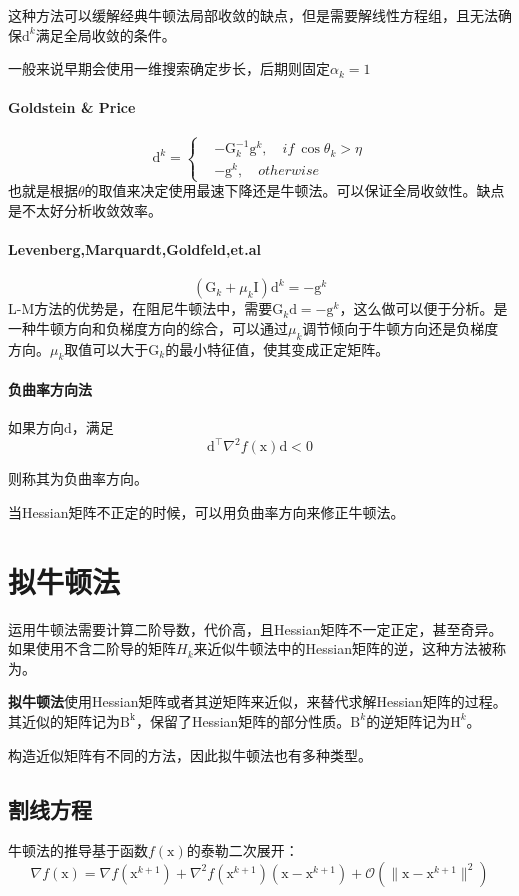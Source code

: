 \documentclass[a4paper]{D:/repositories/MyDGP/latex/PaperReadingLog}
\begin{document}
这种方法可以缓解经典牛顿法局部收敛的缺点，但是需要解线性方程组，且无法确保$\mathrm{d}^k$满足全局收敛的条件。

一般来说早期会使用一维搜索确定步长，后期则固定$\alpha_k=1$

\paragraph{Goldstein \& Price}
$$
\mathrm{d}^k=\left\{
\begin{aligned}
    &-\mathrm{G}_k^{-1}\mathrm{g}^k,\quad if\ \cos\theta_k>\eta\\
    &-\mathrm{g}^k,\quad otherwise
\end{aligned}
\right.
$$
也就是根据$\theta$的取值来决定使用最速下降还是牛顿法。可以保证全局收敛性。缺点是不太好分析收敛效率。

\paragraph{Levenberg,Marquardt,Goldfeld,et.al}
$$
(\mathrm{G}_k+\mu_k\mathrm{I})\mathrm{d}^k=-\mathrm{g}^k
$$
L-M方法的优势是，在阻尼牛顿法中，需要$\mathrm{G}_k\mathrm{d}=-\mathrm{g}^k$，这么做可以便于分析。是一种牛顿方向和负梯度方向的综合，可以通过$\mu_k$调节倾向于牛顿方向还是负梯度方向。$\mu_k$取值可以大于$\mathrm{G}_k$的最小特征值，使其变成正定矩阵。

\paragraph{负曲率方向法}
如果方向$\mathrm{d}$，满足
$$
\mathrm{d}^\top\nabla^2f(\mathrm{x})\mathrm{d}<0
$$

则称其为负曲率方向。

当Hessian矩阵不正定的时候，可以用负曲率方向来修正牛顿法。

\section{拟牛顿法}
运用牛顿法需要计算二阶导数，代价高，且Hessian矩阵不一定正定，甚至奇异。如果使用不含二阶导的矩阵$H_k$来近似牛顿法中的Hessian矩阵的逆，这种方法被称为。

\textbf{拟牛顿法}使用Hessian矩阵或者其逆矩阵来近似，来替代求解Hessian矩阵的过程。其近似的矩阵记为$\mathrm{B^k}$，保留了Hessian矩阵的部分性质。$\mathrm{B}^k$的逆矩阵记为$\mathrm{H}^k$。

构造近似矩阵有不同的方法，因此拟牛顿法也有多种类型。

\subsection{割线方程}
牛顿法的推导基于函数$f(\mathrm{x})$的泰勒二次展开：
$$
\nabla f(\mathrm{x})=\nabla f(\mathrm{x}^{k+1})+\nabla^2f(\mathrm{x}^{k+1})(\mathrm{x}-\mathrm{x}^{k+1})+\mathcal{O}(\lVert \mathrm{x}-\mathrm{x}^{k+1}\lVert^2)
$$
\end{document}
